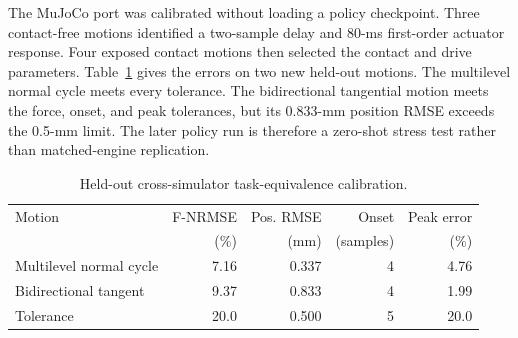 The MuJoCo port was calibrated without loading a policy checkpoint. Three
contact-free motions identified a two-sample delay and 80-ms first-order
actuator response. Four exposed contact motions then selected the contact and
drive parameters. Table~\ref{tab:crosssim_validation} gives the errors on two
new held-out motions. The multilevel normal cycle meets every tolerance. The
bidirectional tangential motion meets the force, onset, and peak tolerances,
but its 0.833-mm position RMSE exceeds the 0.5-mm limit. The later policy run
is therefore a zero-shot stress test rather than matched-engine replication.

\begin{table}[t]
\centering
\caption{Held-out cross-simulator task-equivalence calibration.}
\label{tab:crosssim_validation}
\scriptsize
\begin{tabular}{@{}lrrrr@{}}
\toprule
Motion & F-NRMSE & Pos. RMSE & Onset & Peak error \\
 & (\%) & (mm) & (samples) & (\%) \\
\midrule
Multilevel normal cycle & 7.16 & 0.337 & 4 & 4.76 \\
Bidirectional tangent & 9.37 & 0.833 & 4 & 1.99 \\
\midrule
Tolerance & 20.0 & 0.500 & 5 & 20.0 \\
\bottomrule
\end{tabular}
\end{table}

